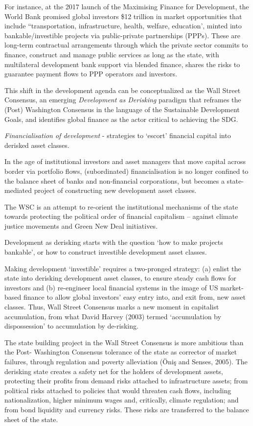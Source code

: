 \documentclass[
]{book}
\begin{document}
For instance, at the 2017
launch of the Maximising Finance for Development, the World Bank promised global
investors \$12 trillion in market opportunities that include ``transportation,
infrastructure, health, welfare, education', minted into bankable/investible projects via
public-private partnerships (PPPs). These are long-term contractual arrangements
through which the private sector commits to finance, construct and manage public
services as long as the state, with multilateral development bank support via blended
finance, shares the risks to guarantee payment flows to PPP operators and investors.

This shift in the development agenda can be conceptualized as the Wall Street
Consensus, an emerging \emph{Development as Derisking} paradigm that reframes the (Post)
Washington Consensus in the language of the Sustainable
Development Goals, and identifies global finance as the actor critical to achieving the
SDG.

\emph{Financialisation of development} - strategies to `escort' financial capital
into derisked asset classes.

In the age of institutional investors
and asset managers that move capital across border via portfolio flows, (subordinated)
financialisation is no longer confined to the balance sheet of banks and non-financial
corporations, but becomes a state-mediated project of constructing new development
asset classes.

The WSC is an attempt to re-orient the institutional mechanisms of
the state towards protecting the political order of financial capitalism --
against climate justice movements and Green New Deal initiatives.

Development as derisking starts with the question `how to make projects bankable', or
how to construct investible development asset classes.

Making development `investible' requires a two-pronged strategy: (a) enlist the state
into derisking development asset classes, to ensure steady cash flows for investors and
(b) re-engineer local financial systems in the image of US market-based finance to
allow global investors' easy entry into, and exit from, new asset classes. Thus, Wall
Street Consensus marks a new moment in capitalist accumulation, from what David
Harvey (2003) termed `accumulation by dispossession' to accumulation by de-risking.

The state building project in the Wall Street Consensus is more ambitious than the Post-
Washington Consensus tolerance of the state as corrector of market failures, through
regulation and poverty alleviation (Öniş and Senses, 2005). The derisking state creates
a safety net for the holders of development assets, protecting their profits from demand
risks attached to infrastructure assets; from political risks attached to policies that would
threaten cash flows, including nationalization, higher minimum wages and, critically,
climate regulation; and from bond liquidity and currency risks. These risks are
transferred to the balance sheet of the state.
\end{document}
